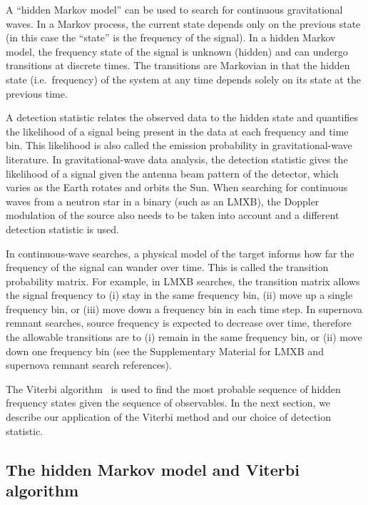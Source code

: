 \documentclass[paper-main.tex]{subfiles}
\begin{document}
A ``hidden Markov model'' can be used to search for continuous gravitational waves.\cite{SuvorovaEtAl:2017} 
In a Markov process, the current state depends only on the previous state (in this case the ``state'' is the frequency of the signal). 
In a hidden Markov model, the frequency state of the signal is unknown (hidden) and can undergo transitions at discrete times. 
The transitions are Markovian in that the hidden state (i.e.\ frequency) of the system at any time depends solely on its state at the previous time. 


A detection statistic relates the observed data to the hidden state and quantifies the likelihood of a signal being present in the data at each frequency and time bin.
This likelihood is also called the emission probability in gravitational-wave literature.  
In gravitational-wave data analysis, the detection statistic gives the likelihood of a signal given the antenna beam pattern of the detector, which varies as the Earth rotates and orbits the Sun.\cite{JKS:1998}
When searching for continuous waves from a neutron star in a binary (such as an LMXB), the Doppler modulation of the source also needs to be taken into account and a different detection statistic is used.\cite{SuvorovaEtAl:2017}


In continuous-wave searches, a physical model of the target informs how far the frequency of the signal can wander over time. 
This is called the transition probability matrix. 
For example, in LMXB searches, the transition matrix allows the signal frequency to (i) stay in the same frequency bin, (ii) move up a single frequency bin, or (iii) move down a frequency bin in each time step.\cite{ScoX1O2Viterbi:2019}
In supernova remnant searches, source frequency is expected to decrease over time, therefore the allowable transitions are to (i) remain in the same frequency bin, or (ii) move down one frequency bin (see the Supplementary Material for LMXB and supernova remnant search references). 


The Viterbi algorithm~\cite{Viterbi:1967} is used to find the most probable sequence of hidden frequency states given the sequence of observables.
In the next section, we describe our application of the Viterbi method and our choice of detection statistic. 




\subsection{The hidden Markov model and Viterbi algorithm}
\label{sec:viterbi}
\end{document}
